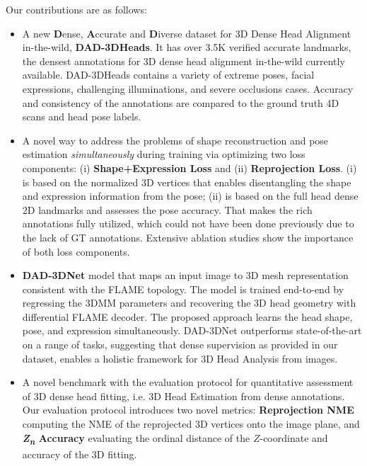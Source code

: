\documentclass[10pt,twocolumn,letterpaper]{article}
\begin{document}
Our contributions are as follows:
\begin{itemize}
\vspace{-0.5em}
    \item
A new \textbf{D}ense, \textbf{A}ccurate and \textbf{D}iverse dataset for 3D Dense Head Alignment in-the-wild, \textbf{DAD-3DHeads}.
It has over 3.5K verified accurate landmarks, the densest annotations for 3D dense head alignment in-the-wild currently available. DAD-3DHeads contains a variety of extreme poses, facial expressions, challenging illuminations, and severe occlusions cases.
    Accuracy and consistency of the annotations are compared to the ground truth 4D scans and head pose labels.
\vspace{-0.5em}
    \item 
A novel way to address the problems of shape reconstruction and pose estimation \emph{simultaneously} during training via optimizing two loss components: (i) \textbf{Shape+Expression Loss} and (ii) \textbf{Reprojection Loss}. 
    (i) is based on the normalized 3D vertices that enables disentangling the shape and expression information from the pose; (ii) is based on the full head dense 2D landmarks and assesses the pose accuracy.
    That makes the rich annotations fully utilized, which could not have been done previously due to the lack of GT annotations. 
    Extensive ablation studies show the importance of both loss components.
    \vspace{-0.5em}
    \item 
    \textbf{DAD-3DNet} model that maps an input image to 3D mesh representation consistent with the FLAME topology. 
    The model is trained end-to-end by regressing the 3DMM parameters and recovering the 3D head geometry with differential FLAME decoder. 
    The proposed approach learns the head shape, pose, and expression simultaneously. 
    DAD-3DNet outperforms state-of-the-art on a range of tasks, suggesting that dense supervision as provided in our dataset, enables a holistic framework for 3D Head Analysis from images. \vspace{-0.5em}
    \item  
    A novel benchmark with the evaluation protocol for quantitative assessment of 3D dense head fitting, i.e. 3D Head Estimation from dense annotations.
Our evaluation protocol introduces two novel metrics: \textbf{Reprojection NME} computing the NME of the reprojected 3D vertices onto the image plane, and \textbf{\textit{Z\textsubscript{n}} Accuracy} evaluating the ordinal distance of the $Z$-coordinate and accuracy of the 3D fitting. 
\end{itemize}
%
\end{document}
